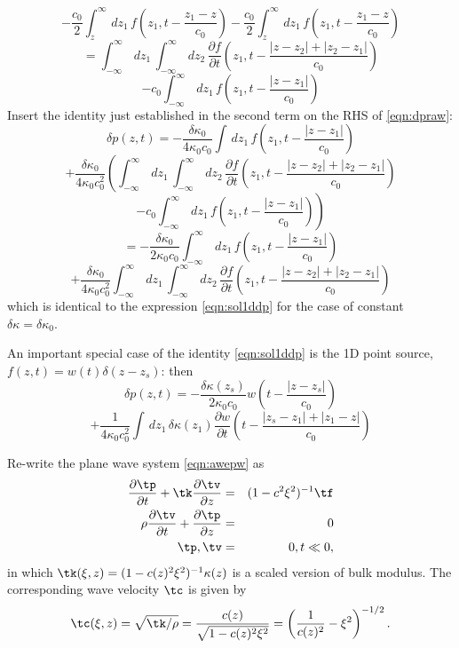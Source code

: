  \[
   - \frac{c_0}{2}\int^{\infty}_z \,dz_1\,f\left(z_1,t-\frac{z_1-z}{c_0}\right)
   -\frac{c_0}{2} \int^{\infty}_z \,dz_1\,f\left(z_1,t-\frac{z_1-z}{c_0}\right)
 \]
 \[
   =\int_{-\infty}^{\infty} \,dz_1\,\int_{-\infty}^{\infty} \,dz_2\, \frac{\partial f}{\partial
     t}\left(z_1,t-\frac{|z-z_2|+|z_2-z_1|}{c_0}\right)
 \]
 \[
   -c_0\int_{-\infty}^{\infty} \,dz_1\, f\left(z_1,t-\frac{|z-z_1|}{c_0}\right)
 \]
 Insert the identity just established in the second term on the RHS of
 \ref{eqn:dpraw}:
 \[
  \delta p(z,t) = -\frac{\delta \kappa_0}{4 \kappa_0 c_0} \int
  \,dz_1\,f\left(z_1,t-\frac{|z-z_1|}{c_0}\right)
\]
\[
  +\frac{\delta \kappa_0}{4\kappa_0c_0^2}\left(\int_{-\infty}^{\infty} \,dz_1\,\int_{-\infty}^{\infty} \,dz_2\, \frac{\partial f}{\partial
      t}\left(z_1,t-\frac{|z-z_2|+|z_2-z_1|}{c_0}\right) \right.
\]
\[
  \left. -c_0\int_{-\infty}^{\infty} \,dz_1\,
    f\left(z_1,t-\frac{|z-z_1|}{c_0}\right)\right)
\]
\[
=-\frac{\delta \kappa_0}{2\kappa_0c_0}\int_{-\infty}^{\infty} \,dz_1\,
f\left(z_1,t-\frac{|z-z_1|}{c_0}\right)
\]
\begin{equation}
  \label{eqn:dpraw}
+  \frac{\delta \kappa_0}{4\kappa_0c_0^2}\int_{-\infty}^{\infty} \,dz_1\,\int_{-\infty}^{\infty} \,dz_2\, \frac{\partial f}{\partial
      t}\left(z_1,t-\frac{|z-z_2|+|z_2-z_1|}{c_0}\right)
  \end{equation}
which is identical to the expression \ref{eqn:sol1ddp} for the case of constant
$\delta \kappa = \delta \kappa_0$.

An important special case of the identity \ref{eqn:sol1ddp} is the 1D point source,
$f(z,t)=w(t)\delta(z-z_s)$: then
\[
  \delta p(z,t) = -\frac{\delta \kappa(z_s)}{2\kappa_0c_0}w\left(t - \frac{|z-z_s|}{c_0}\right)
\]
\begin{equation}
  \label{eqn:sol1ddppw}
  +\frac{1}{4\kappa_0c_0^2} \int \,dz_1\,\delta 
  \kappa(z_1) \frac{\partial w}{\partial t}\left(t - \frac{|z_s-z_1|+|z_1-z|}{c_0}\right)
\end{equation}


Re-write the plane wave system \ref{eqn:awepw} as
\begin{eqnarray}
\label{eqn:awepw1}
\frac{\partial \tp}{\partial t} + \tk\frac{\partial
  \tv}{\partial z} &=& (1-c^2\xi^2)^{-1}\tf \nonumber\\
\rho \frac{\partial \tv}{\partial t} + \frac{\partial \tp}{\partial
  z}&=&0\nonumber\\
\tp,\tv&=&0, t \ll 0,
\end{eqnarray}
in which $\tk(\xi,z)=(1-c(z)^2\xi^2)^{-1}\kappa(z)$ is a scaled version of
bulk modulus. The corresponding wave velocity $\tc$ is given by
\[
\tc(\xi,z)=\sqrt{\tk/\rho} = \frac{c(z)}{\sqrt{1-c(z)^2\xi^2}} =
\left(\frac{1}{c(z)^2}-\xi^2\right)^{-1/2}.
\]

